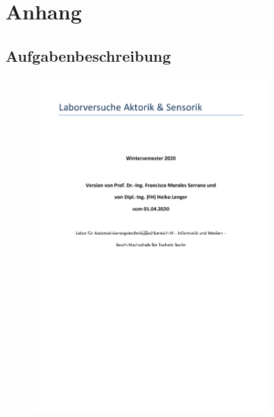 \section{Anhang}

\subsection{Aufgabenbeschreibung}
\begin{figure}[H]
    \centering
    \includegraphics[page=3, width=0.8\textwidth]{../Aufgabenstellung.pdf}
    \label{fig:Aufgabenstellung A1}
\end{figure}

